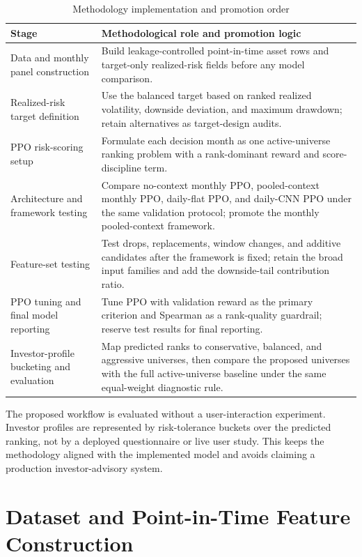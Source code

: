 \begin{table}[H]
\centering
\scriptsize
\caption{Methodology implementation and promotion order}
\label{tab:promotion_protocol}
\begin{tabularx}{\textwidth}{L{3.2cm}Y}
\toprule
Stage & Methodological role and promotion logic \\
\midrule
Data and monthly panel construction & Build leakage-controlled point-in-time asset rows and target-only realized-risk fields before any model comparison. \\
Realized-risk target definition & Use the balanced target based on ranked realized volatility, downside deviation, and maximum drawdown; retain alternatives as target-design audits. \\
PPO risk-scoring setup & Formulate each decision month as one active-universe ranking problem with a rank-dominant reward and score-discipline term. \\
Architecture and framework testing & Compare no-context monthly PPO, pooled-context monthly PPO, daily-flat PPO, and daily-CNN PPO under the same validation protocol; promote the monthly pooled-context framework. \\
Feature-set testing & Test drops, replacements, window changes, and additive candidates after the framework is fixed; retain the broad input families and add the downside-tail contribution ratio. \\
PPO tuning and final model reporting & Tune PPO with validation reward as the primary criterion and Spearman as a rank-quality guardrail; reserve test results for final reporting. \\
Investor-profile bucketing and evaluation & Map predicted ranks to conservative, balanced, and aggressive universes, then compare the proposed universes with the full active-universe baseline under the same equal-weight diagnostic rule. \\
\bottomrule
\end{tabularx}
\end{table}

The proposed workflow is evaluated without a user-interaction experiment. Investor profiles are represented by risk-tolerance buckets over the predicted ranking, not by a deployed questionnaire or live user study. This keeps the methodology aligned with the implemented model and avoids claiming a production investor-advisory system.

\section{Dataset and Point-in-Time Feature Construction}
\label{sec:dataset_features}

